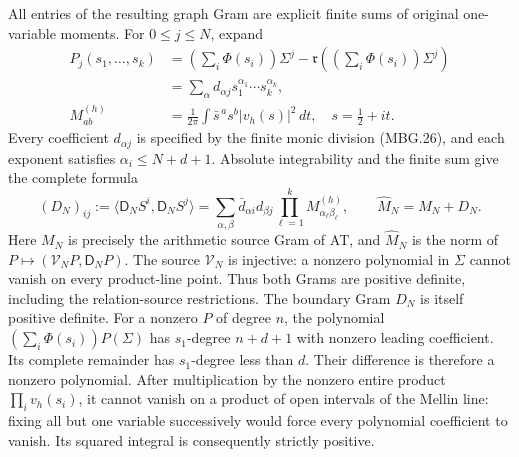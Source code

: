 All entries of the resulting graph Gram are explicit finite sums of
original one-variable moments. For \(0\le j\le N\), expand
\[
 \begin{aligned}
 P_j(s_1,\ldots,s_k)&=
  \left(\sum_i\Phi(s_i)\right)\Sigma^j
       -\mathfrak r\!\left(\left(\sum_i\Phi(s_i)\right)\Sigma^j\right)
 \\&=\sum_{\alpha}d_{\alpha j}s_1^{\alpha_1}\cdots s_k^{\alpha_k},\\
 M_{ab}^{(h)}&=\frac1{2\pi}\int
    \bar s^{\,a}s^b|v_h(s)|^2\,dt,\quad s=\tfrac12+it .
 \end{aligned}
 \tag{MBG.28}\label{GraphV2:eq:mbg-coefficients}
\]
Every coefficient \(d_{\alpha j}\) is specified by the finite monic
division (MBG.26), and each exponent satisfies
\(\alpha_i\le N+d+1\). Absolute integrability and the finite sum
give the complete formula
\[
 (D_N)_{ij}:=\langle\mathsf D_NS^i,\mathsf D_NS^j\rangle
   =\sum_{\alpha,\beta}\bar d_{\alpha i}d_{\beta j}
                          \prod_{\ell=1}^k M_{\alpha_\ell\beta_\ell}^{(h)},
 \qquad \widehat M_N=M_N+D_N .
 \tag{MBG.29}\label{GraphV2:eq:mbg-finite-window-gram}
\]
Here \(M_N\) is precisely the arithmetic source Gram of AT, and
\(\widehat M_N\) is the norm of
\(P\mapsto(\mathcal V_NP,\mathsf D_NP)\). The source
\(\mathcal V_N\) is injective: a nonzero polynomial in \(\Sigma\)
cannot vanish on every product-line point. Thus both Grams are
positive definite, including the relation-source restrictions.
The boundary Gram \(D_N\) is itself positive definite. For a
nonzero \(P\) of degree \(n\), the polynomial
\((\sum_i\Phi(s_i))P(\Sigma)\) has \(s_1\)-degree \(n+d+1\)
with nonzero leading coefficient. Its complete remainder has
\(s_1\)-degree less than \(d\). Their difference is therefore a
nonzero polynomial. After multiplication by the nonzero entire
product \(\prod_i v_h(s_i)\), it cannot vanish on a product of
open intervals of the Mellin line: fixing all but one variable
successively would force every polynomial coefficient to vanish.
Its squared integral is consequently strictly positive.

